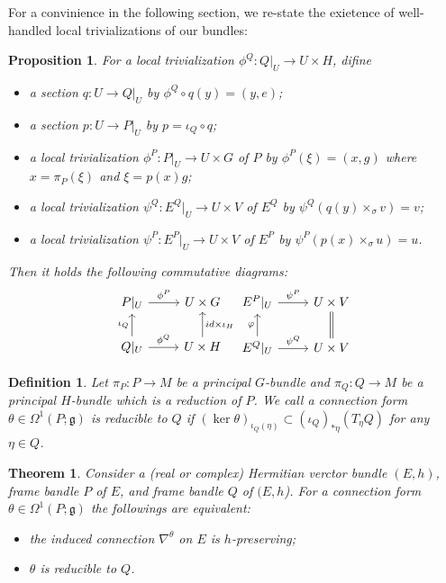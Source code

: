 \documentclass[b5paper]{article}
\newcommand{\frakg}{\mathfrak{g}}
\newtheorem{proposition}{Proposition}
\newtheorem{theorem}{Theorem}
\newtheorem{definition}{Definition}
\begin{document}
  For a convinience in the following section,
  we re-state the exietence of well-handled local trivializations of our bundles:

  \begin{proposition}
    For a local trivialization $\phi^Q: Q|_U \to U \times H$,
    difine 
    \begin{itemize}
      \item a section $q: U \to Q|_U$ by $\phi^Q \circ q (y) = (y, e)$;
      \item a section $p: U \to P|_U$ by $p = \iota_Q \circ q$;
      \item a local trivialization $\phi^P: P|_U \to U \times G$ of $P$ by 
        $\phi^P(\xi) = (x, g)$ where $x = \pi_P(\xi)$ and $\xi = p(x) g$;
      \item a local trivialization $\psi^Q: E^Q|_U \to U \times V$ of $E^Q$ by
        $\psi^Q(q(y) \times_\sigma v) = v$;
      \item a local trivialization $\psi^P: E^P|_U \to U \times V$ of $E^P$ by
        $\psi^P(p(x) \times_\sigma u) = u$.
    \end{itemize}
    Then it holds the following commutative diagrams:
    \[
      \begin{tikzcd}
      P|_U \arrow[r, "\phi^P"] 
      & U \times G\\
      Q|_U \arrow[u,"\iota_Q"] \arrow[r, "\phi^Q"] 
      & U \times H \arrow[u, "id \times \iota_H"']
      \end{tikzcd} %
      \begin{tikzcd}
      E^P|_U \arrow[r, "\psi^P"] 
      & U \times V \\
      E^Q|_U \arrow[u,"\varphi"] \arrow[r, "\psi^Q"] 
      & U \times V \arrow[u, equal]
      \end{tikzcd}
    \]
  \end{proposition}


  \begin{definition}
    Let $\pi_P: P \to M$ be a principal $G$-bundle and
    $\pi_Q: Q \to M$ be a principal $H$-bundle which is a reduction of $P$.
    We call a connection form $\theta \in \Omega^1(P; \frakg)$ is {\rm reducible to $Q$}
    if $(\ker \theta)_{\iota_Q(\eta)} \subset (\iota_Q)_{*\eta}(T_\eta Q)$
    for any $\eta \in Q$.
  \end{definition}

  \begin{theorem}
    Consider a (real or complex) Hermitian verctor bundle $(E, h)$,
    frame bandle $P$ of $E$, and frame bandle $Q$ of $(E, h$).
    For a connection form $\theta \in \Omega^1(P; \frakg)$ 
    the followings are equivalent:
    \begin{itemize}
      \item the induced connection $\nabla^\theta$ on $E$ is $h$-preserving;
      \item $\theta$ is reducible to $Q$.
    \end{itemize}

  \end{theorem}
\end{document}
